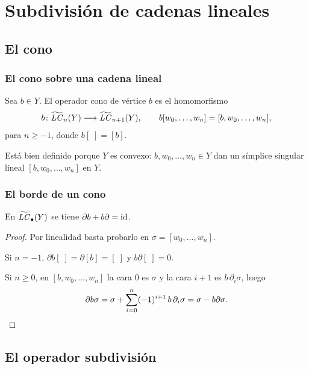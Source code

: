\section{Subdivisión de cadenas lineales}

\subsection{El cono}

\begin{frame}
  \frametitle{El cono sobre una cadena lineal}

  \begin{definition}
    Sea $b\in Y$. El \alert{operador cono} de vértice $b$ es el homomorfismo
    \[
      b\colon\widetilde{\mathit{LC}}_n(Y)\longrightarrow\widetilde{\mathit{LC}}_{n+1}(Y),
      \qquad
      b[w_0,\ldots,w_n]=[b,w_0,\ldots,w_n],
    \]
    para $n\geq-1$, donde $b[\;]=[b]$.
  \end{definition}

  \medskip

  Está bien definido porque $Y$ es convexo: $b,w_0,\ldots,w_n\in Y$ dan un
  símplice singular lineal $[b,w_0,\ldots,w_n]$ en $Y$.
\end{frame}

\begin{frame}
  \frametitle{El borde de un cono}

  \begin{lemma}
    En $\widetilde{\mathit{LC}}_\bullet(Y)$ se tiene $\partial b+b\partial=\operatorname{id}$.
  \end{lemma}

  \begin{proof}
    Por linealidad basta probarlo en $\sigma=[w_0,\ldots,w_n]$.

    \medskip

    Si $n=-1$, $\partial b[\;]=\partial[b]=[\;]$ y $b\partial[\;]=0$.

    \medskip

    Si $n\geq0$, en $[b,w_0,\ldots,w_n]$ la cara $0$ es $\sigma$ y la cara
    $i+1$ es $b\,\partial_i\sigma$, luego
    \[
      \partial b\sigma
      =\sigma+\sum_{i=0}^n(-1)^{i+1}\,b\,\partial_i\sigma
      =\sigma-b\partial\sigma.\qedhere
    \]
  \end{proof}
\end{frame}

\subsection{El operador subdivisión}

